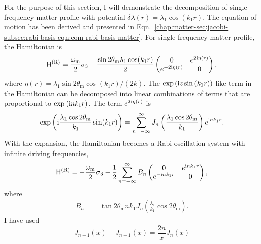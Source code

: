 For the purpose of this section, I will demonstrate the decomposition of single frequency matter profile with potential $\delta\lambda(r) = \lambda_1\cos(k_1 r)$. The equation of motion has been derived and presented in Eqn.~\ref{chap:matter-sec:jacobi-subsec:rabi-basis-eqn:eom-rabi-basis-matter}. For single frequency matter profile, the Hamiltonian is 
\begin{equation}
    \mathsf H^{(\mathrm R)} = \frac{\omega_\mathrm m}{2} \sigma_3 - \frac{\sin 2\theta_\mathrm m \lambda_1\cos (k_1 r)}{2} \begin{pmatrix}
        0 & e^{2\mathrm{i} \eta(r)} \\
        e^{-2\mathrm{i} \eta(r)} & 0
    \end{pmatrix},
\end{equation}
where $\eta(r) =  \lambda_1 \sin 2\theta_{\mathrm m} \cos (k_1 r)/(2 k) $. The $\exp\left( \mathrm{i} z \sin\left(k_1 r \right) \right)$-like term in the Hamiltonian can be decomposed into linear combinations of terms that are proportional to $\exp\left(\mathrm{i} n k_1 r \right)$. The term $e^{2\mathrm{i} \eta(r)}$ is
\begin{equation}
    \exp\left({\mathrm{i} \frac{\lambda_1 \cos 2\theta_{\mathrm m}}{k_1} \sin (k_1 r) }\right)  =  \sum_{n=-\infty}^{\infty} J_n \left( \frac{\lambda_1 \cos 2\theta_\mathrm m}{k_1}\right) e^{\mathrm{i} n k_1 r}.
\end{equation}
With the expansion, the Hamiltonian becomes a Rabi oscillation system with infinite driving frequencies,
\begin{equation}
    \mathsf H^{(\mathrm{R})} =
    -\frac{\omega_{\mathrm{m}}}{2} \sigma_3
    -  \frac{1}{2} \sum_{n=-\infty}^\infty B_n \begin{pmatrix}
    0 &  e^{\ri n k_1  r} \\
     e^{ - \ri n k_1 r} & 0
    \end{pmatrix},
    \label{chap:matter-sec:jacobi-eqn:hamil-jacobi-expanded}
\end{equation}
where
\begin{align}
    B_n &= \tan 2\theta_{\mathrm m} n k_1 J_{n} \left( \frac{\lambda_1}{k_1}\cos 2\theta_{\mathrm m} \right).
\end{align}
I have used
\begin{equation}
    J_{n-1}(x) + J_{n+1}(x) = \frac{2 n}{x} J_n(x)
    \label{eqn:bessel-function-sum-property}
\end{equation}
